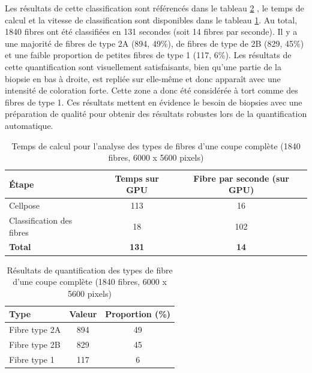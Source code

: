 Les résultats de cette classification sont référencés dans le tableau \ref{tab:atp_wsi_resultstable} , le temps de calcul et la vitesse de classification sont disponibles dans le tableau \ref{tab:atp_wsi_timetable}. Au total, 1840 fibres ont été classifiées en 131 secondes (soit 14 fibres par seconde). Il y a une majorité de fibres de type 2A (894, 49\%), de fibres de type de 2B (829, 45\%) et une faible proportion de petites fibres de type 1 (117, 6\%). Les résultats de cette quantification sont visuellement satisfaisants, bien qu'une partie de la biopsie en bas à droite, est repliée sur elle-même et donc apparaît avec une intensité de coloration forte. Cette zone a donc été considérée à tort comme des fibres de type 1. Ces résultats mettent en évidence le besoin de biopsies avec une préparation de qualité pour obtenir des résultats robustes lors de la quantification automatique.

\begin{table}[!ht]
\centering
\caption{Temps de calcul pour l'analyse des types de fibres d'une coupe complète (1840 fibres, 6000 x 5600 pixels)}
\label{tab:atp_wsi_timetable}
\begin{tabular}{|l|c|c|}
\hline
\textbf{Étape} & \textbf{Temps sur GPU} & \textbf{Fibre par seconde (sur GPU)} \\
\hline
Cellpose & 113 & 16 \\
\hline
Classification des fibres & 18 & 102 \\
\hline
\textbf{Total} & \textbf{131} & \textbf{14} \\
\hline
\end{tabular}
\end{table}
\begin{table}[!ht]
\centering
\caption{Résultats de quantification des types de fibre d'une coupe complète (1840 fibres, 6000 x 5600 pixels)}
\label{tab:atp_wsi_resultstable}
\begin{tabular}{|l|c|c|}
\hline
\textbf{Type} & \textbf{Valeur} & \textbf{Proportion (\%)} \\
\hline
Fibre type 2A & 894 & 49 \\
\hline
Fibre type 2B & 829 & 45 \\
\hline
Fibre type 1 & 117 & 6 \\
\hline
\end{tabular}
\end{table}



